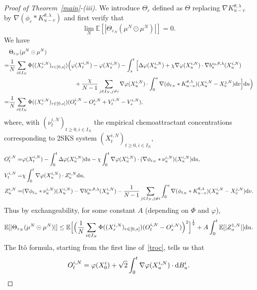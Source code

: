 \documentclass[11pt]{article}
\newcommand{\E}{\mathbb{E}}
\newcommand{\1}{\mathbbm{1}}
\newcommand{\dd}{{\rm d}}
\newcommand{\e}{\varepsilon}
\begin{document}
\begin{proof}[Proof of Theorem~\ref{main}-(iii)]
We introduce $\Theta_\e$ defined as $\Theta$ replacing $\nabla K^{\theta,\lambda}_{u-v}$
by $\nabla(\phi_\e \ast K^{\theta,\lambda}_{u-v})$ and first verify that
\begin{equation}\label{scc1}
\lim_N \E[|\Theta_{\e_N}(\mu^N\odot \mu^N)|]=0.
\end{equation}
We have
\begin{align*}
&\Theta_{\e_N}(\mu^N\odot \mu^N)\\
=&\frac1{N}\sum_{i\in I_{N}}
\Phi((X^{i,N}_r)_{r\in [0,s]}) 
\Big(\varphi(X^{i,N}_t)-\varphi(X^{i,N}_s) -\int_s^t \Big[ \Delta \varphi(X^{i,N}_u)+\chi \nabla \varphi(X^{i,N}_u)\cdot \nabla b^{c_0,\theta,\lambda}_s(X^{i,N}_u)\\
& \hskip4cm
+ \frac{\chi}{N-1}\sum_{j\in I_{N},j\neq i}\nabla \varphi(X^{i,N}_u)\cdot 
\int_0^u \nabla (\phi_{\e_N}\ast K^{\theta,\lambda}_{u-v})(X^{i,N}_u-X^{j,N}_v) \dd v \Big]\dd u \Big)\\
=&\frac 1{N}\sum_{i\in I_{N}}
\Phi((X^{i,N}_r)_{r\in [0,s]})(O^{i,N}_t-O^{i,N}_s+V^{i,N}_t-V^{i,N}_s),
\end{align*}
where, with $(\nu^{i,N}_t)_{t\geq 0,i \in I_N}$ the empirical chemoattractant concentrations corresponding to
2SKS system $(X^{i,N}_t)_{t\geq 0, i\in I_N}$,
\begin{align*}
O^{i,N}_t=& \varphi(X^{i,N}_t) - \int_0^t \Delta \varphi(X^{i,N}_u)\dd u
-\chi \int_0^t \nabla\varphi(X^{i,N}_u) \cdot (\nabla \phi_{\e_N}\ast \nu^{i,N}_u)(X^{i,N}_u) \dd u,\\
V^{i,N}_t=& \chi \int_0^t \nabla\varphi(X^{i,N}_u) \cdot Z^{i,N}_u \dd u,\\
Z^{i,N}_u=&  (\nabla \phi_{\e_n}\ast \nu^{i,N}_u)(X^{i,N}_u)-\nabla b^{c_0,\theta,\lambda}_u(X^{i,N}_u)
- \frac1{N-1}\sum_{j\in I_{N},j\neq i}\int_0^u \nabla(\phi_{\e_N}\ast K^{\theta,\lambda}_{u-v})(X^{i,N}_u-X^{j,N}_v) \dd v.
\end{align*}
Thus by exchangeability, for some constant $A$ (depending on $\Phi$ and $\varphi$),
\begin{equation}\label{ar1}
\E[|\Theta_{\e_N}(\mu^N\odot \mu^N)|]\leq \E\Big[ \Big(\frac 1{N}\sum_{i\in I_{N}}
\Phi((X^{i,N}_r)_{r\in [0,s]})(O^{i,N}_t-O^{i,N}_s)\Big)^2 \Big]^{\frac12} + A\int_0^t\E[|Z^{1,N}_u|]\dd u.
\end{equation}
The Itô formula, starting from the first line of~\eqref{troc}, tells us that
\begin{align*}
O^{i,N}_t= \varphi(X^{i}_0) + \sqrt 2 \int_0^t \nabla \varphi(X^{i,N}_u) \cdot \dd B^i_u.
\end{align*}

\end{proof}
\end{document}
